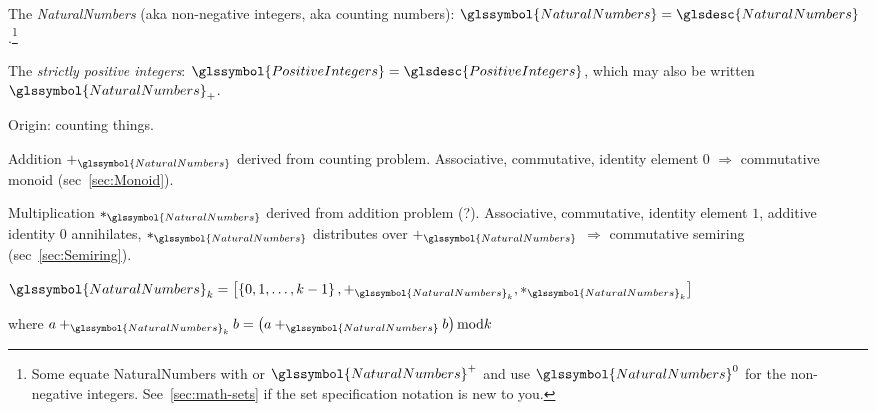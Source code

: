 \label{sec:Numbers}

% 


\lstset{language=Clojure}

\label{sec:Natural-numbers}

The \textit{\gls{NaturalNumbers}} (aka non-negative integers, aka counting
numbers):\label{NaturalNumbers}
$\glssymbol{NaturalNumbers} = \glsdesc{NaturalNumbers}$.\footnote{ 
Some
equate \gls{NaturalNumbers} with  
or $\glssymbol{NaturalNumbers}^{+}$ and use
$\glssymbol{NaturalNumbers}^{0}$ for the non-negative integers. 
See~\autoref{sec:math-sets} if the set specification
notation is new to you.}

The \textit{strictly positive integers}: 
$\glssymbol{PositiveIntegers} = \glsdesc{PositiveIntegers}$, which 
may also be written $\glssymbol{NaturalNumbers}_{+}$.

Origin: counting things.

Addition $+_{\glssymbol{NaturalNumbers}}$ 
derived from counting problem.
Associative, commutative, identity element $0$ $\Rightarrow$ 
commutative monoid (sec~\ref{sec:Monoid}).

Multiplication $*_{\glssymbol{NaturalNumbers}}$
derived from addition problem (?).
Associative, commutative, identity element $1$,
additive identity $0$ annihilates,
$*_{\glssymbol{NaturalNumbers}}$ distributes over 
$+_{\glssymbol{NaturalNumbers}}$ 
 $\Rightarrow$
commutative semiring 
(sec~\ref{sec:Semiring}).



${\glssymbol{NaturalNumbers}}_{k} = 
\left[ \left\{ 0, 1, \ldots, k-1 \right\},
+_{\glssymbol{NaturalNumbers}_{k}},
*_{\glssymbol{NaturalNumbers}_{k}} \right]$

where
$a +_{\glssymbol{NaturalNumbers}_{k}} b =
\left( a +_{\glssymbol{NaturalNumbers}} b \right) \text{mod} k$

